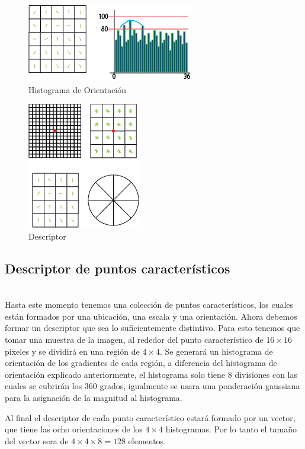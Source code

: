 	\begin{figure}[h]
			\centering
				\includegraphics[scale=1.5]{img/HistoOrientacion.png}
			\caption{Histograma de Orientación }
	\end{figure}
	
	
	\begin{figure}[h]
			\centering
				\includegraphics[scale=1.5]{img/Descriptor.png}
			\caption{Descriptor }
	\end{figure}
		
		
	\subsection{Descriptor de puntos característicos} \hfill \\
	Hasta este momento tenemos una colección de puntos característicos, los cuales están formados por una ubicación, una escala y una orientación. Ahora debemos formar un descriptor que sea lo suficientemente distintivo. Para esto tenemos que tomar una muestra de la imagen, al rededor del punto característico de $16\times16$ pixeles y se dividirá en una región de $4 \times 4$. Se generará un histograma de orientación de los gradientes de cada región, a diferencia del histograma de orientación explicado anteriormente, el histograma solo tiene 8 divisiones con las cuales se cubrirán los 360 grados, igualmente se usara una ponderación gaussiana para la asignación de la magnitud al histograma.
		
	Al final el descriptor de cada punto característico estará formado por un vector, que tiene las ocho orientaciones de los $4\times4$ histogramas. Por lo tanto el tamaño del vector sera de $4\times4\times8 = 128$ elementos. 
 
 
 







